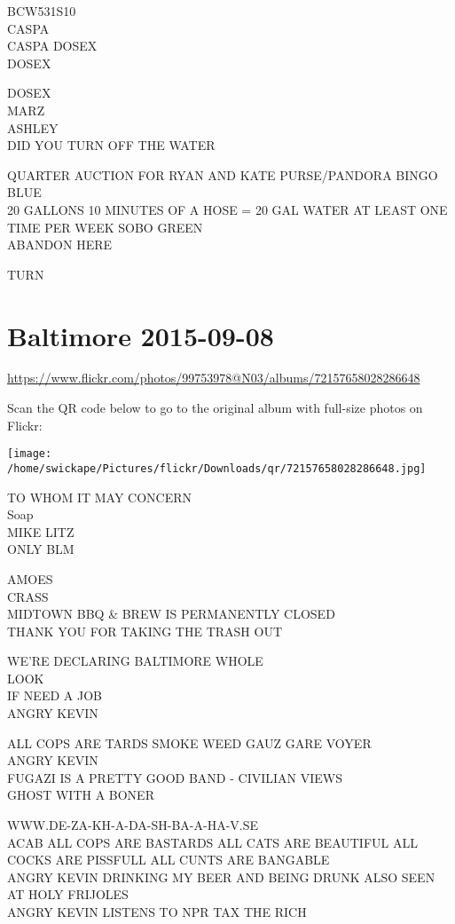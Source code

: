 \documentclass[10pt,letterpaper]{article}
\begin{document}
BCW531S10\\
CASPA\\
CASPA DOSEX\\
DOSEX

DOSEX\\
MARZ\\
ASHLEY\\
DID YOU TURN OFF THE WATER

QUARTER AUCTION FOR RYAN AND KATE PURSE/PANDORA BINGO\\
BLUE\\
20 GALLONS 10 MINUTES OF A HOSE = 20 GAL WATER AT LEAST ONE TIME PER WEEK SOBO GREEN\\
ABANDON HERE

TURN


\section*{Baltimore 2015-09-08}

\url{https://www.flickr.com/photos/99753978@N03/albums/72157658028286648}

Scan the QR code below to go to the original album with full-size photos on Flickr:

\texttt{[image: /home/swickape/Pictures/flickr/Downloads/qr/72157658028286648.jpg]}


TO WHOM IT MAY CONCERN\\
Soap\\
MIKE LITZ\\
ONLY BLM

AMOES\\
CRASS\\
MIDTOWN BBQ \& BREW IS PERMANENTLY CLOSED\\
THANK YOU FOR TAKING THE TRASH OUT

WE'RE DECLARING BALTIMORE WHOLE\\
LOOK\\
IF NEED A JOB\\
ANGRY KEVIN

ALL COPS ARE TARDS SMOKE WEED GAUZ GARE VOYER\\
ANGRY KEVIN\\
FUGAZI IS A PRETTY GOOD BAND {-} CIVILIAN VIEWS\\
GHOST WITH A BONER

WWW.DE{-}ZA{-}KH{-}A{-}DA{-}SH{-}BA{-}A{-}HA{-}V.SE\\
ACAB ALL COPS ARE BASTARDS ALL CATS ARE BEAUTIFUL ALL COCKS ARE PISSFULL ALL CUNTS ARE BANGABLE\\
ANGRY KEVIN DRINKING MY BEER AND BEING DRUNK ALSO SEEN AT HOLY FRIJOLES\\
ANGRY KEVIN LISTENS TO NPR TAX THE RICH
\end{document}
